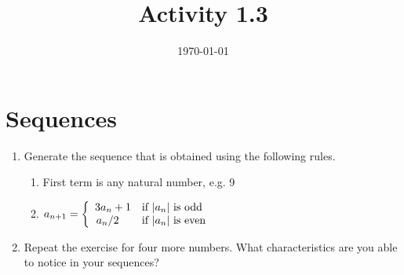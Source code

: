 \documentclass[12pt]{amsart}
\title{Activity 1.3}
\date{\today}
\begin{document}
\maketitle
\part*{Sequences}
\begin{enumerate}
\item Generate the sequence that is obtained using the following rules.
\begin{enumerate}
    \item First term is any natural number, e.g. 9
    \item $a_{n+1} = \left\{ 
        \begin{array}{ll} 
            3a_n + 1 & \text{if } \abs{a_n} \text{ is odd}\\
            \flatfrac{a_n}{2} & \text{if } \abs{a_n} \text{ is even} 
        \end{array}\right.$
\end{enumerate}
\item Repeat the exercise for four more numbers. What characteristics are you able to notice in your sequences?
\end{enumerate}  
\end{document}
